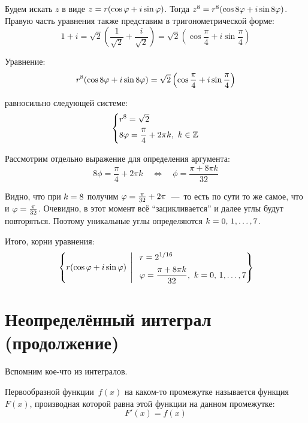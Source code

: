 \documentclass[a4paper,12pt]{article}
\newcommand{\BigMiddleThree}{\;\left|\vphantom{\begin{pmatrix} 0\\0\\0 \end{pmatrix}}\right.\;}
\begin{document}
  \begin{solution}
    Будем искать $z$ в виде $z \hm= r (\cos\phi \hm+ i\sin\phi)$.
    Тогда $z^8 \hm= r^8 (\cos{8\phi} \hm+ i\sin{8\phi})$.
    Правую часть уравнения также представим в тригонометрической форме:
    \[
      1 + i = \sqrt{2} \left(\frac{1}{\sqrt{2}} + \frac{i}{\sqrt{2}}\right) = \sqrt{2} \left(\cos{\frac{\pi}{4}} + i \sin{\frac{\pi}{4}}\right)
    \]

    Уравнение:
    \[
      r^8 (\cos{8\phi} \hm+ i\sin{8\phi}) = \sqrt{2} \left(\cos{\frac{\pi}{4}} + i \sin{\frac{\pi}{4}}\right)
    \]

    равносильно следующей системе:
    \[
      \left\{
        \begin{aligned}
          &r^8 = \sqrt{2}\\
          &8\varphi = \frac{\pi}{4} + 2\pi k,\ k \in \mathbb Z
        \end{aligned}
      \right.
    \]

    Рассмотрим отдельно выражение для определения аргумента:
    \[
      8\phi = \frac{\pi}{4} + 2\pi k \quad\Leftrightarrow \quad \phi = \frac{\pi + 8\pi k}{32}
    \]

    Видно, что при $k \hm= 8$ получим $\phi \hm= \frac{\pi}{32} \hm+ 2\pi$~---~то есть по сути то же самое, что и $\phi \hm= \frac{\pi}{32}$.
    Очевидно, в этот момент всё ``зацикливается'' и далее углы будут повторяться.
    Поэтому уникальные углы определяются $k \hm= 0,\, 1, \ldots, 7$.

    Итого, корни уравнения:  %
    \[
      \left\{
        r (\cos\phi + i \sin \phi) \BigMiddleThree \:\begin{aligned}
          &r = 2^{1/16}\\
          &\phi = \frac{\pi + 8\pi k}{32},\ k = 0,\,1,\ldots, 7
        \end{aligned}
      \right\}
    \]
  \end{solution}



  \section{Неопределённый интеграл (продолжение)}
  
  Вспомним кое-что из интегралов.
  
  Первообразной функции~$f(x)$ на каком-то промежутке называется функция~$F(x)$, производная которой равна этой функции на данном промежутке:
  \[
    F'(x) = f(x)
  \]
  
\end{document}
